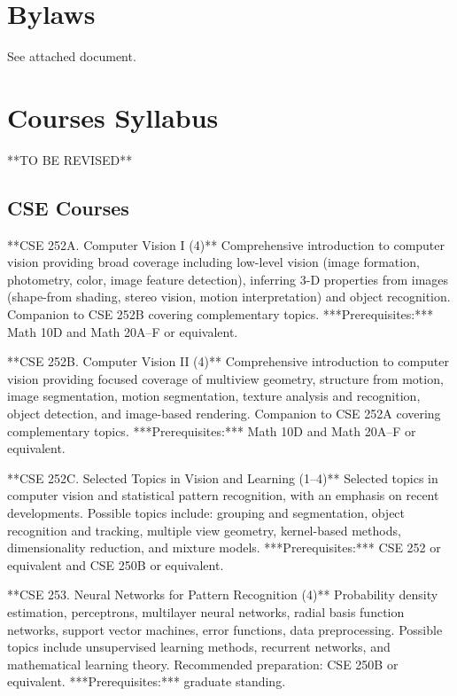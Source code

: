 \documentclass[11pt,letterpaper]{article}
\begin{document}
\newpage

\section{Bylaws}
\label{App:Bylaws}

See attached document.

\newpage

\section{Courses Syllabus}
\label{App:Courses}

**TO BE REVISED**

\subsection{CSE Courses}

**CSE 252A. Computer Vision I (4)** Comprehensive introduction to
computer vision providing broad coverage including low-level vision
(image formation, photometry, color, image feature detection), inferring
3-D properties from images (shape-from shading, stereo vision, motion
interpretation) and object recognition. Companion to CSE 252B covering
complementary topics. ***Prerequisites:*** Math 10D and Math 20A–F or
equivalent.

**CSE 252B. Computer Vision II (4)** Comprehensive introduction to
computer vision providing focused coverage of multiview geometry,
structure from motion, image segmentation, motion segmentation, texture
analysis and recognition, object detection, and image-based rendering.
Companion to CSE 252A covering complementary topics.
***Prerequisites:*** Math 10D and Math 20A–F or equivalent.

**CSE 252C. Selected Topics in Vision and Learning (1–4)** Selected
topics in computer vision and statistical pattern recognition, with an
emphasis on recent developments. Possible topics include: grouping and
segmentation, object recognition and tracking, multiple view geometry,
kernel-based methods, dimensionality reduction, and mixture models.
***Prerequisites:*** CSE 252 or equivalent and CSE 250B or equivalent.

**CSE 253. Neural Networks for Pattern Recognition (4)** Probability
density estimation, perceptrons, multilayer neural networks, radial
basis function networks, support vector machines, error functions, data
preprocessing. Possible topics include unsupervised learning methods,
recurrent networks, and mathematical learning theory. Recommended
preparation: CSE 250B or equivalent. ***Prerequisites:*** graduate
standing.
\end{document}

